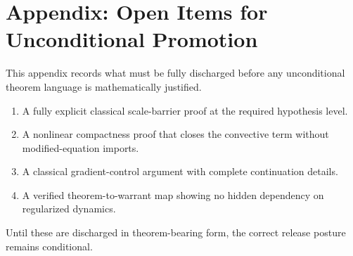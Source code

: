 \section{Appendix: Open Items for Unconditional Promotion}

This appendix records what must be fully discharged before any unconditional theorem language is mathematically justified.

\begin{enumerate}[leftmargin=*]
\item A fully explicit classical scale-barrier proof at the required hypothesis level.
\item A nonlinear compactness proof that closes the convective term without modified-equation imports.
\item A classical gradient-control argument with complete continuation details.
\item A verified theorem-to-warrant map showing no hidden dependency on regularized dynamics.
\end{enumerate}

Until these are discharged in theorem-bearing form, the correct release posture remains conditional.
